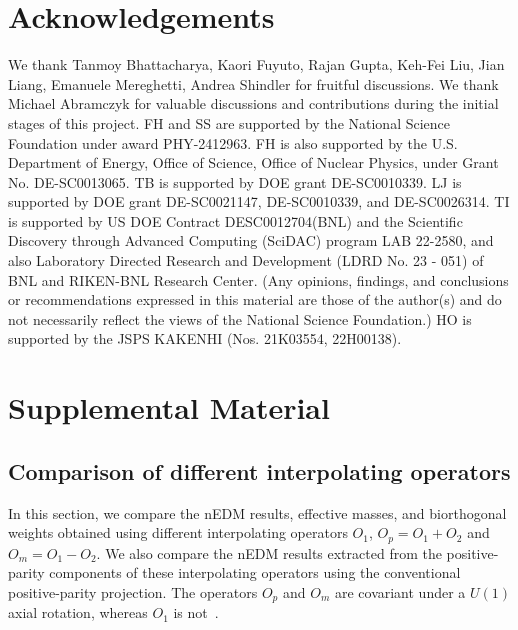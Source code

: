 \documentclass[aps,prl,twocolumn,superscriptaddress,nofootinbib]{revtex4-2}
\begin{document}
\section{Acknowledgements}
We thank Tanmoy Bhattacharya, Kaori Fuyuto, Rajan Gupta, Keh-Fei Liu, Jian Liang, Emanuele Mereghetti, Andrea Shindler for fruitful discussions. We thank Michael Abramczyk for valuable discussions and contributions during the initial stages of this project. FH and SS are supported by the National Science Foundation under award PHY-2412963. FH is also supported by the U.S. Department of Energy, Office of Science, Office of Nuclear Physics, under Grant No. DE-SC0013065. TB is supported by DOE grant DE-SC0010339. LJ is supported by DOE grant DE-SC0021147, DE-SC0010339, and DE-SC0026314. TI is supported by US DOE Contract DESC0012704(BNL) and the Scientific Discovery through Advanced Computing (SciDAC) program LAB 22-2580, and also Laboratory Directed Research and Development (LDRD No. 23 - 051) of BNL and RIKEN-BNL Research Center. (Any opinions,
findings, and conclusions or recommendations expressed in this material are those of the author(s) and do not
necessarily reflect the views of the National Science Foundation.)
HO is supported by the JSPS KAKENHI (Nos. 21K03554, 22H00138).



\clearpage

\onecolumngrid
\section*{Supplemental Material}
\subsection{Comparison of different interpolating operators}
In this section, we compare the nEDM results, effective masses, and biorthogonal weights obtained using different interpolating operators $O_1$, $O_p=O_1+O_2$ and  $O_m=O_1-O_2$. We also compare the nEDM results extracted from the positive-parity components of these interpolating operators using the conventional
positive-parity projection.
The operators $O_p$ and $O_m$ are covariant under a $U(1)$ axial rotation, whereas $O_1$ is not~\cite{Ema:2024vfn}.  
\end{document}
